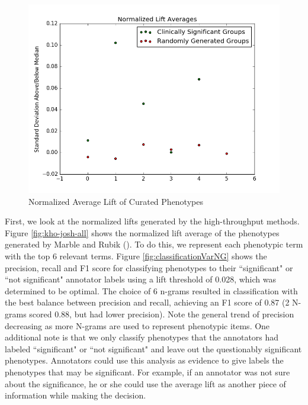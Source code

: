 \documentclass{sig-alternate-05-2015}
\begin{document}
\begin{figure} [t]
\centering
\includegraphics[width=\linewidth] {normalizedLiftAvg_labeled_Ordered.png}
\caption{Normalized Average Lift of Curated Phenotypes}
\label{fig:curatedPhenos}
\end{figure}


First, we look at the normalized lifts generated by the high-throughput methods. Figure \ref{fig:kho-josh-all} shows the normalized lift average of the phenotypes generated by Marble and Rubik (\cite {Ho:2014jc,Ho:2014da, wang2015rubik}). 
To do this, we represent each phenotypic term with the top 6 relevant terms. Figure \ref{fig:classificationVarNG} shows the precision, recall and F1 score for classifying phenotypes to their ``significant" or ``not significant" annotator labels using a lift threshold of 0.028, which was determined to be optimal. 
The choice of 6 n-grams resulted in classification with the best balance between precision and recall, achieving an F1 score of 0.87 (2 N-grams scored 0.88, but had lower precision). 
Note the general trend of precision decreasing as more N-grams are used to represent phenotypic items.
One additional note is that we only classify phenotypes that the annotators had labeled ``significant" or ``not significant" and leave out the questionably significant phenotypes. 
Annotators could use this analysis as evidence to give labels the phenotypes that may be significant.
For example, if an annotator was not sure about the significance, he or she could use the average lift as another piece of information while making the decision.
\end{document}

